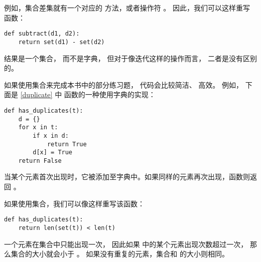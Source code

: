 例如，集合差集就有一个对应的  方法，或者操作符 \li{-}。
因此，我们可以这样重写  函数：

\begin{lstlisting}
def subtract(d1, d2):
    return set(d1) - set(d2)
\end{lstlisting}


结果是一个集合， 而不是字典， 但对于像迭代这样的操作而言， 二者是没有区别的。


如果使用集合来完成本书中的部分练习题， 代码会比较简洁、 高效。
例如， 下面是 \ref{duplicate} 中  函数的一种使用字典的实现：

\begin{lstlisting}
def has_duplicates(t):
    d = {}
    for x in t:
        if x in d:
            return True
        d[x] = True
    return False
\end{lstlisting}


当某个元素首次出现时，它被添加至字典中。如果同样的元素再次出现，函数则返回  。


如果使用集合，我们可以像这样重写该函数：

\begin{lstlisting}
def has_duplicates(t):
    return len(set(t)) < len(t)
\end{lstlisting}


一个元素在集合中只能出现一次， 因此如果  中的某个元素出现次数超过一次， 那么集合的大小就会小于 。  如果没有重复的元素，集合和  的大小则相同。


